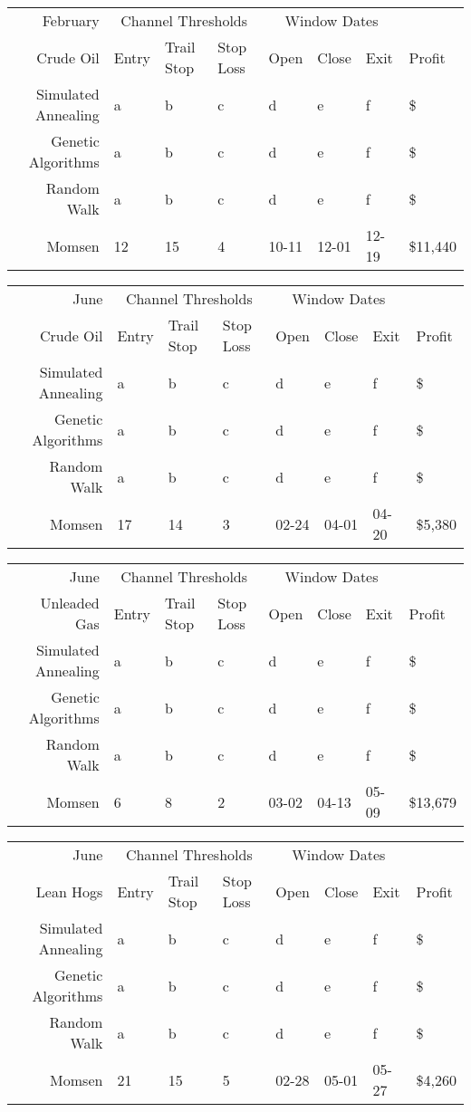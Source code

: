 \documentclass[12pt]{article}
\begin{document}
\begin{tabular}{|r|l|l|l|l|l|l|l|}
  \hline
  February & \multicolumn{3}{|c|}{Channel Thresholds} & \multicolumn{3}{|c|}{Window Dates} &  \\
  Crude Oil & Entry & Trail Stop & Stop Loss & Open & Close & Exit & Profit\\ \hline
  Simulated Annealing & a & b & c & d & e & f & \$ \\ \hline
  Genetic Algorithms & a & b & c & d & e & f & \$ \\ \hline
  Random Walk & a & b & c & d & e & f & \$ \\ \hline
  Momsen & 12 & 15 & 4 & 10-11 & 12-01 & 12-19 & \$11,440 \\ \hline
\end{tabular}

\begin{tabular}{|r|l|l|l|l|l|l|l|}
  \hline
  June & \multicolumn{3}{|c|}{Channel Thresholds} & \multicolumn{3}{|c|}{Window Dates} &  \\
  Crude Oil & Entry & Trail Stop & Stop Loss & Open & Close & Exit & Profit\\ \hline
  Simulated Annealing & a & b & c & d & e & f & \$ \\ \hline
  Genetic Algorithms & a & b & c & d & e & f & \$ \\ \hline
  Random Walk & a & b & c & d & e & f & \$ \\ \hline
  Momsen & 17 & 14 & 3 & 02-24 & 04-01 & 04-20 & \$5,380 \\ \hline
\end{tabular}

\begin{tabular}{|r|l|l|l|l|l|l|l|}
  \hline
  June & \multicolumn{3}{|c|}{Channel Thresholds} & \multicolumn{3}{|c|}{Window Dates} &  \\
  Unleaded Gas & Entry & Trail Stop & Stop Loss & Open & Close & Exit & Profit\\ \hline
  Simulated Annealing & a & b & c & d & e & f & \$ \\ \hline
  Genetic Algorithms & a & b & c & d & e & f & \$ \\ \hline
  Random Walk & a & b & c & d & e & f & \$ \\ \hline
  Momsen & 6 & 8 & 2 & 03-02 & 04-13 & 05-09 & \$13,679 \\ \hline
\end{tabular}

\begin{tabular}{|r|l|l|l|l|l|l|l|}
  \hline
  June & \multicolumn{3}{|c|}{Channel Thresholds} & \multicolumn{3}{|c|}{Window Dates} &  \\
  Lean Hogs & Entry & Trail Stop & Stop Loss & Open & Close & Exit & Profit\\ \hline
  Simulated Annealing & a & b & c & d & e & f & \$ \\ \hline
  Genetic Algorithms & a & b & c & d & e & f & \$ \\ \hline
  Random Walk & a & b & c & d & e & f & \$ \\ \hline
  Momsen & 21 & 15 & 5 & 02-28 & 05-01 & 05-27 & \$4,260 \\ \hline
\end{tabular}
\end{document}

